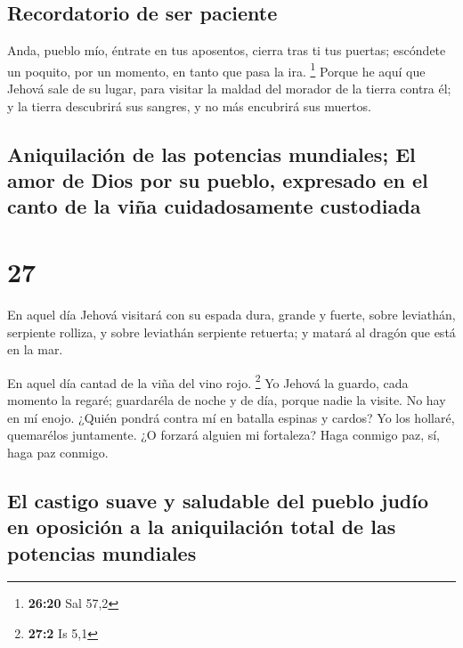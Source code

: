 \hypertarget{recordatorio-de-ser-paciente}{%
\subsection{Recordatorio de ser
paciente}\label{recordatorio-de-ser-paciente}}

 Anda, pueblo mío, éntrate en tus aposentos, cierra tras
ti tus puertas; escóndete un poquito, por un momento, en tanto que pasa
la ira. \footnote{\textbf{26:20} Sal 57,2}  Porque he
aquí que Jehová sale de su lugar, para visitar la maldad del morador de
la tierra contra él; y la tierra descubrirá sus sangres, y no más
encubrirá sus muertos.

\hypertarget{aniquilaciuxf3n-de-las-potencias-mundiales-el-amor-de-dios-por-su-pueblo-expresado-en-el-canto-de-la-viuxf1a-cuidadosamente-custodiada}{%
\subsection{Aniquilación de las potencias mundiales; El amor de Dios por
su pueblo, expresado en el canto de la viña cuidadosamente
custodiada}\label{aniquilaciuxf3n-de-las-potencias-mundiales-el-amor-de-dios-por-su-pueblo-expresado-en-el-canto-de-la-viuxf1a-cuidadosamente-custodiada}}

\hypertarget{section-26}{%
\section{27}\label{section-26}}

 En aquel día Jehová visitará con su espada dura, grande y
fuerte, sobre leviathán, serpiente rolliza, y sobre leviathán serpiente
retuerta; y matará al dragón que está en la mar.

 En aquel día cantad de la viña del vino rojo. \footnote{\textbf{27:2}
  Is 5,1}  Yo Jehová la guardo, cada momento la regaré;
guardaréla de noche y de día, porque nadie la visite.  No
hay en mí enojo. ¿Quién pondrá contra mí en batalla espinas y cardos? Yo
los hollaré, quemarélos juntamente.  ¿O forzará alguien mi
fortaleza? Haga conmigo paz, sí, haga paz conmigo.

\hypertarget{el-castigo-suave-y-saludable-del-pueblo-juduxedo-en-oposiciuxf3n-a-la-aniquilaciuxf3n-total-de-las-potencias-mundiales}{%
\subsection{El castigo suave y saludable del pueblo judío en oposición a
la aniquilación total de las potencias
mundiales}\label{el-castigo-suave-y-saludable-del-pueblo-juduxedo-en-oposiciuxf3n-a-la-aniquilaciuxf3n-total-de-las-potencias-mundiales}}

